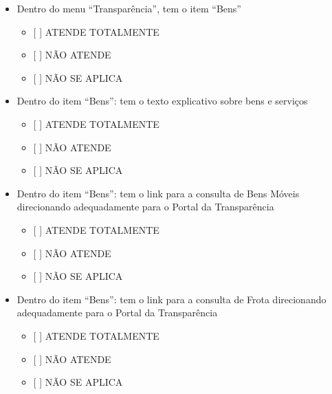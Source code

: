 \documentclass[]{book}
\providecommand{\tightlist}{%
  \setlength{\itemsep}{0pt}\setlength{\parskip}{0pt}}
\begin{document}
\begin{itemize}
\tightlist
\item
  Dentro do menu ``Transparência'', tem o item ``Bens''

  \begin{itemize}
  \tightlist
  \item
    {[} {]} ATENDE TOTALMENTE
  \item
    {[} {]} NÃO ATENDE
  \item
    {[} {]} NÃO SE APLICA
  \end{itemize}
\item
  Dentro do item ``Bens'': tem o texto explicativo sobre bens e serviços

  \begin{itemize}
  \tightlist
  \item
    {[} {]} ATENDE TOTALMENTE
  \item
    {[} {]} NÃO ATENDE
  \item
    {[} {]} NÃO SE APLICA
  \end{itemize}
\item
  Dentro do item ``Bens'': tem o link para a consulta de Bens Móveis direcionando adequadamente para o Portal da Transparência

  \begin{itemize}
  \tightlist
  \item
    {[} {]} ATENDE TOTALMENTE
  \item
    {[} {]} NÃO ATENDE
  \item
    {[} {]} NÃO SE APLICA
  \end{itemize}
\item
  Dentro do item ``Bens'': tem o link para a consulta de Frota direcionando adequadamente para o Portal da Transparência

  \begin{itemize}
  \tightlist
  \item
    {[} {]} ATENDE TOTALMENTE
  \item
    {[} {]} NÃO ATENDE
  \item
    {[} {]} NÃO SE APLICA
  \end{itemize}
\end{itemize}
\end{document}
